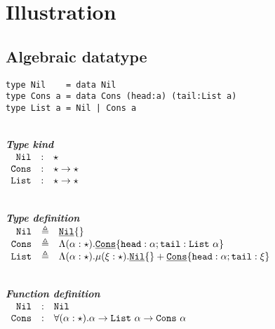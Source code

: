 \documentclass{article}[11pt]
\newcommand{\subsubsubsection}[1]
{
    ~\\
    {\bf {\em #1}} \\
}
\newcommand{\term}[1]{\verb~#1~}
\newcommand{\cons}[1]{\underline{\verb~#1~}}
\begin{document}
    \section{Illustration}\label{sec:illustration}

    \subsection{Algebraic datatype}\label{subsec:algebraic-datatype}

    \begin{verbatim}
type Nil    = data Nil
type Cons a = data Cons (head:a) (tail:List a)
type List a = Nil | Cons a
    \end{verbatim}

    \subsubsubsection{Type kind}

    \noindent
    \begin{math}
        \begin{array}{rclp{5cm}}
            \term{Nil}  & : & \star                   \\
            \term{Cons} & : & \star \rightarrow \star \\
            \term{List} & : & \star \rightarrow \star
        \end{array}
    \end{math}

    \subsubsubsection{Type definition}

    \noindent
    \begin{math}
        \begin{array}{rclp{5cm}}
            \term{Nil}  & \triangleq & \cons{Nil}\{\}                                                                                                \\
            \term{Cons} & \triangleq & \Lambda(\alpha:\star).\cons{Cons}\{ \term{head} :\alpha; \term{tail} : \term{List} ~ \alpha \}                \\
            \term{List} & \triangleq & \Lambda(\alpha:\star).\mu(\xi:\star).\cons{Nil}\{\} + \cons{Cons}\{ \term{head} :\alpha; \term{tail} : \xi \}
        \end{array}
    \end{math}

    \subsubsubsection{Function definition}

    \noindent
    \begin{math}
        \begin{array}{rclp{5cm}}
            \term{Nil}  & : & \term{Nil}                                                                                   \\
            \term{Cons} & : & \forall(\alpha:\star).\alpha \rightarrow \term{List}~\alpha \rightarrow \term{Cons} ~ \alpha \\
        \end{array}
    \end{math}
\end{document}
